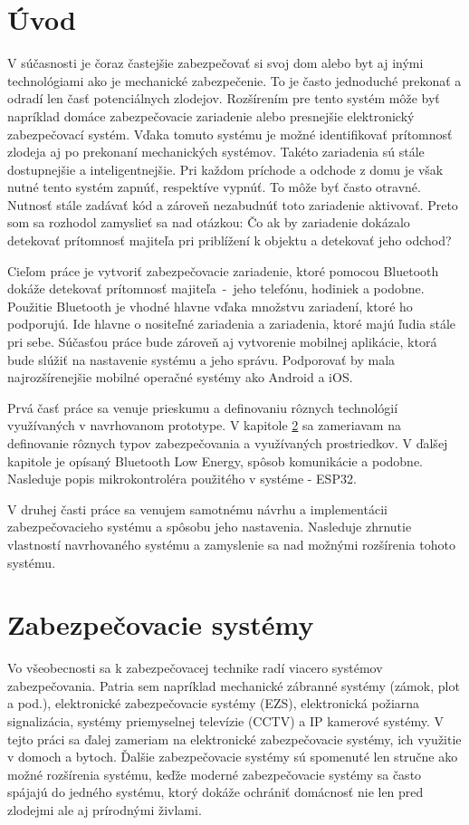 \chapter{Úvod}

V súčasnosti je čoraz častejšie zabezpečovať si svoj dom alebo byt aj inými technológiami ako je mechanické zabezpečenie. To je často jednoduché prekonať a odradí len časť potenciálnych zlodejov. Rozšírením pre tento systém môže byť napríklad domáce zabezpečovacie zariadenie alebo presnejšie elektronický zabezpečovací systém. Vďaka tomuto systému je možné identifikovať prítomnosť zlodeja aj po prekonaní mechanických systémov. Takéto zariadenia sú stále dostupnejšie a inteligentnejšie. Pri každom príchode a odchode z domu je však nutné tento systém zapnúť, respektíve vypnúť. To môže byť často otravné. Nutnosť stále zadávať kód a zároveň nezabudnúť toto zariadenie aktivovať. Preto som sa rozhodol zamyslieť sa nad otázkou: Čo ak by zariadenie dokázalo detekovať prítomnosť majiteľa pri priblížení k objektu a detekovať jeho odchod?

Cieľom práce je vytvoriť zabezpečovacie zariadenie, ktoré pomocou Bluetooth dokáže detekovať prítomnosť majiteľa~-~jeho telefónu, hodiniek a podobne. Použitie Bluetooth je vhodné hlavne vďaka množstvu zariadení, ktoré ho podporujú. Ide hlavne o nositeľné zariadenia a zariadenia, ktoré majú ľudia stále pri sebe.
Súčasťou práce bude zároveň aj vytvorenie mobilnej aplikácie, ktorá bude slúžiť na nastavenie systému a jeho správu. Podporovať by mala najrozšírenejšie mobilné operačné systémy ako Android a iOS.

Prvá časť práce sa venuje prieskumu a definovaniu rôznych technológií využívaných v navrhovanom prototype. V kapitole \ref{chap:ZS} sa zameriavam na definovanie rôznych typov zabezpečovania a využívaných prostriedkov. V ďalšej kapitole je opísaný Bluetooth Low Energy, spôsob komunikácie a podobne. Nasleduje popis mikrokontroléra použitého v systéme - ESP32. 

V druhej časti práce sa venujem samotnému návrhu a implementácii zabezpečovacieho systému a spôsobu jeho nastavenia. Nasleduje zhrnutie vlastností navrhovaného systému a zamyslenie sa nad možnými rozšírenia tohoto systému.

\chapter{Zabezpečovacie systémy}\label{chap:ZS}

Vo všeobecnosti sa k zabezpečovacej technike radí viacero systémov zabezpečovania. Patria sem napríklad mechanické zábranné systémy (zámok, plot a pod.), elektronické zabezpečovacie systémy (EZS), elektronická požiarna signalizácia, systémy priemyselnej televízie (CCTV) a IP kamerové systémy. V tejto práci sa ďalej zameriam na elektronické zabezpečovacie systémy, ich využitie v domoch a bytoch. Ďalšie zabezpečovacie systémy sú spomenuté len stručne ako možné rozšírenia systému, keďže moderné zabezpečovacie systémy sa často spájajú do jedného systému, ktorý dokáže ochrániť domácnosť nie len pred zlodejmi ale aj prírodnými živlami.

